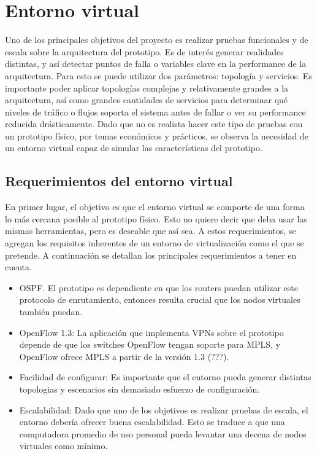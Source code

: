 \chapter{Entorno virtual}
Uno de los principales objetivos del proyecto es realizar pruebas funcionales y de escala sobre la arquitectura del prototipo. Es de interés generar realidades distintas, y así detectar puntos de falla o variables clave en la performance de la arquitectura. Para esto se puede utilizar dos parámetros: topología y servicios. Es importante poder aplicar topologías complejas y relativamente grandes a la arquitectura, así como grandes cantidades de servicios para determinar qué niveles de tráfico o flujos soporta el sistema antes de fallar o ver su performance reducida drásticamente. Dado que no es realista hacer este tipo de pruebas con un prototipo físico, por temas económicos y prácticos, se observa la necesidad de un entorno virtual capaz de simular las características del prototipo.

\section{Requerimientos del entorno virtual}
En primer lugar, el objetivo es que el entorno virtual se comporte de una forma lo más cercana posible al prototipo físico. Esto no quiere decir que deba usar las mismas herramientas, pero es deseable que así sea. A estos requerimientos, se agregan los requisitos inherentes de un entorno de virtualización como el que se pretende. A continuación se detallan los principales requerimientos a tener en cuenta.
\begin{itemize} 
	\item OSPF. El prototipo es dependiente en que los routers puedan utilizar este protocolo de enrutamiento, entonces resulta crucial que los nodos virtuales también puedan.
	\item OpenFlow 1.3: La aplicación que implementa VPNs sobre el prototipo depende de que los switches OpenFlow tengan soporte para MPLS, y OpenFlow ofrece MPLS a partir de la versión 1.3 (???).
	\item Facilidad de configurar: Es importante que el entorno pueda generar distintas topologias y escenarios sin demasiado esfuerzo de configuración.
	\item Escalabilidad: Dado que uno de los objetivos es realizar pruebas de escala, el entorno debería ofrecer buena escalabilidad. Esto se traduce a que una computadora promedio de uso personal pueda levantar una decena de nodos virtuales como mínimo.
\end{itemize}

